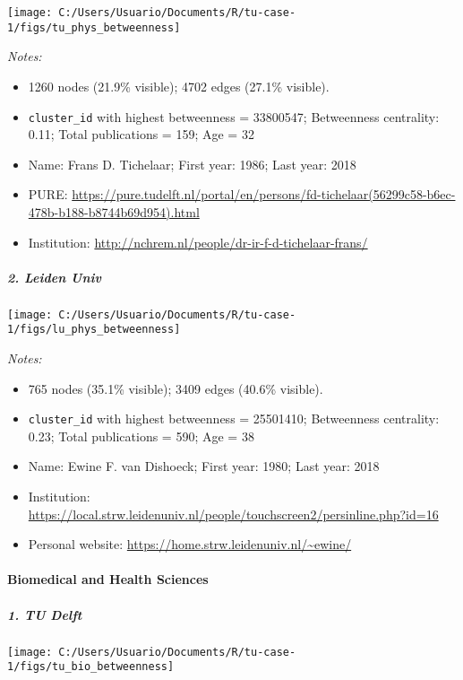 \documentclass[]{article}
\providecommand{\tightlist}{%
  \setlength{\itemsep}{0pt}\setlength{\parskip}{0pt}}
\let\oldparagraph\paragraph
\renewcommand{\paragraph}[1]{\oldparagraph{#1}\mbox{}}
\let\oldsubparagraph\subparagraph
\renewcommand{\subparagraph}[1]{\oldsubparagraph{#1}\mbox{}}
\begin{document}
\texttt{[image: C:/Users/Usuario/Documents/R/tu-case-1/figs/tu\_phys\_betweenness]}

\emph{Notes:}

\begin{itemize}
\tightlist
\item
  1260 nodes (21.9\% visible); 4702 edges (27.1\% visible).
\item
  \texttt{cluster\_id} with highest betweenness = 33800547; Betweenness
  centrality: 0.11; Total publications = 159; Age = 32
\item
  Name: Frans D. Tichelaar; First year: 1986; Last year: 2018
\item
  PURE:
  \url{https://pure.tudelft.nl/portal/en/persons/fd-tichelaar(56299c58-b6ec-478b-b188-b8744b69d954).html}
\item
  Institution: \url{http://nchrem.nl/people/dr-ir-f-d-tichelaar-frans/}
\end{itemize}

\hypertarget{leiden-univ}{%
\subparagraph{2. Leiden Univ}\label{leiden-univ}}

\texttt{[image: C:/Users/Usuario/Documents/R/tu-case-1/figs/lu\_phys\_betweenness]}

\emph{Notes:}

\begin{itemize}
\tightlist
\item
  765 nodes (35.1\% visible); 3409 edges (40.6\% visible).
\item
  \texttt{cluster\_id} with highest betweenness = 25501410; Betweenness
  centrality: 0.23; Total publications = 590; Age = 38
\item
  Name: Ewine F. van Dishoeck; First year: 1980; Last year: 2018
\item
  Institution:
  \url{https://local.strw.leidenuniv.nl/people/touchscreen2/persinline.php?id=16}
\item
  Personal website: \url{https://home.strw.leidenuniv.nl/~ewine/}
\end{itemize}

\hypertarget{biomedical-and-health-sciences}{%
\paragraph{Biomedical and Health
Sciences}\label{biomedical-and-health-sciences}}

\hypertarget{tu-delft-1}{%
\subparagraph{1. TU Delft}\label{tu-delft-1}}

\texttt{[image: C:/Users/Usuario/Documents/R/tu-case-1/figs/tu\_bio\_betweenness]}
\end{document}
